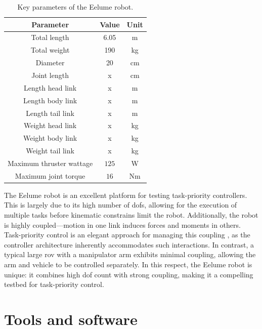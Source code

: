 \begin{table}[h]
    \centering
    \begin{tabular}{|c|c|c|}
        \hline
        Parameter  & Value & Unit   \\ \hline \hline
        Total length & 6.05 & m     \\ \hline
        Total weight & 190  & kg    \\ \hline
        Diameter & 20 & cm    \\ \hline
        Joint length & x & cm    \\ \hline
        Length head link & x & m     \\ \hline
        Length body link & x & m     \\ \hline
        Length tail link & x & m     \\ \hline
        Weight head link & x & kg     \\ \hline
        Weight body link & x & kg     \\ \hline
        Weight tail link & x & kg     \\ \hline
        Maximum thruster wattage & \(125\) & W     \\ \hline
        Maximum joint torque & \(16\) & Nm     \\ \hline
        \hline
    \end{tabular}
    \caption{Key parameters of the Eelume robot.}
    \label{tab:eelume:keynumbers}
\end{table}
The Eelume robot is an excellent platform for testing task-priority controllers.
This is largely due to its high number of \gls{dof}s, allowing for the 
execution of multiple tasks before kinematic constrains limit the robot. Additionally, 
the robot is highly coupled—motion in one link induces forces and moments in 
others. Task-priority control is an elegant approach for managing this coupling
, as the controller architecture inherently accommodates such interactions. In 
contrast, a typical large \gls{rov} with a manipulator arm exhibits minimal 
coupling, allowing the arm and vehicle to be controlled separately. In this 
respect, the Eelume robot is unique: it combines high \gls{dof} count with 
strong coupling, making it a compelling testbed for task-priority control.

\section{Tools and software}

